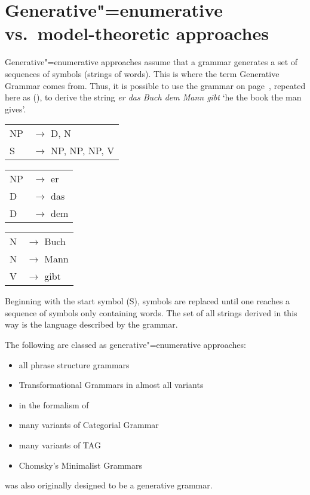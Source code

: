 
\chapter{Generative"=enumerative vs.\ model-theoretic approaches}
\label{Abschnitt-Generativ-Modelltheoretisch}\label{chap-mts}


Generative"=enumerative approaches assume that a grammar generates a set of sequences of symbols (strings of words).
This is where the term Generative Grammar comes from. Thus, it is possible to use the grammar on
page~\pageref{bsp-grammatik-psg}, repeated here as (), to derive the string \emph{er das Buch dem Mann gibt}
`he the book the man gives'.
\ea
\label{bsp-grammatik-psg-zwei}
\begin{tabular}[t]{@{}l@{ }l}
{NP} & {$\to$ D, N}\\          
{S}  & {$\to$ NP, NP, NP, V}
\end{tabular}\hspace{2cm}%
\begin{tabular}[t]{@{}l@{ }l}
{NP} & {$\to$ er}\\
{D}  & {$\to$ das}\\
{D}  & {$\to$ dem}\\
\end{tabular}\hspace{8mm}
\begin{tabular}[t]{@{}l@{ }l}
{N} & {$\to$ Buch}\\
{N} & {$\to$ Mann}\\
{V} & {$\to$ gibt}\\
\end{tabular}
\z
Beginning with the start symbol (S), symbols are replaced until one reaches a sequence of symbols only containing words.
The set of all strings derived in this way is the language described by the grammar.

The following are classed as generative"=enumerative approaches:
\begin{itemize}
\item all phrase structure grammars
\item Transformational Grammars in almost all variants
\item \gpsg in the formalism of \citet*{GKPS85a}
\item many variants of Categorial Grammar\indexcg
\item many variants of TAG\indextag
\item Chomsky's Minimalist Grammars
\end{itemize}
\lfg was also originally designed to be a generative grammar.

